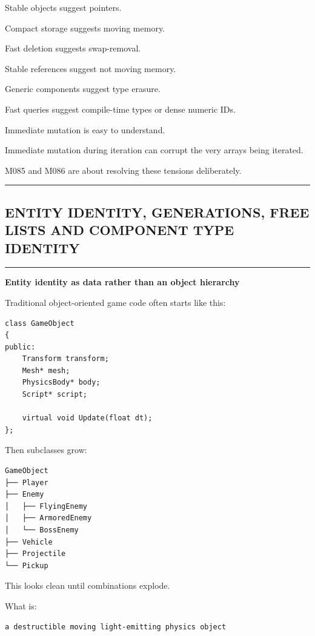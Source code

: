 Stable objects suggest pointers.

Compact storage suggests moving memory.

Fast deletion suggests swap-removal.

Stable references suggest not moving memory.

Generic components suggest type erasure.

Fast queries suggest compile-time types or dense numeric IDs.

Immediate mutation is easy to understand.

Immediate mutation during iteration can corrupt the very arrays being iterated.

M085 and M086 are about resolving these tensions deliberately.

\begin{center}\rule{0.5\linewidth}{0.5pt}\end{center}

\subsection{ENTITY IDENTITY, GENERATIONS, FREE LISTS AND COMPONENT TYPE IDENTITY}\label{05-engine-i-ch014-entity-identity-generations-free-lists-and-component-type-identity}

\begin{center}\rule{0.5\linewidth}{0.5pt}\end{center}

\textbf{Entity identity as data rather than an object hierarchy}

Traditional object-oriented game code often starts like this:

\begin{verbatim}
class GameObject
{
public:
    Transform transform;
    Mesh* mesh;
    PhysicsBody* body;
    Script* script;

    virtual void Update(float dt);
};
\end{verbatim}

Then subclasses grow:

\begin{verbatim}
GameObject
├── Player
├── Enemy
│   ├── FlyingEnemy
│   ├── ArmoredEnemy
│   └── BossEnemy
├── Vehicle
├── Projectile
└── Pickup
\end{verbatim}

This looks clean until combinations explode.

What is:

\begin{verbatim}
a destructible moving light-emitting physics object
\end{verbatim}

